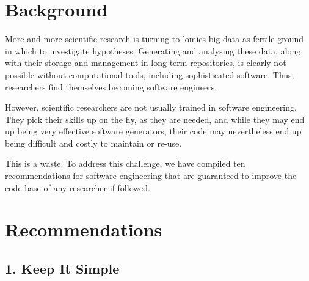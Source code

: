 \documentclass{bmcart}
\begin{document}


\section*{Background}

More and more scientific research is turning to 'omics big data as fertile ground in which to investigate hypotheses. Generating and analysing these data, along with their storage and management in long-term repositories, is clearly not possible without computational tools, including sophisticated software. Thus, researchers find themselves becoming software engineers. 

However, scientific researchers are not usually trained in software engineering. They pick their skills up on the fly, as they are needed, and while they may end up being very effective software generators, their code may nevertheless end up being difficult and costly to maintain or re-use. 

This is a waste. To address this challenge, we have compiled ten recommendations for software engineering that are guaranteed to improve the code base of any researcher if followed. 

\section*{Recommendations}

\subsection*{1. Keep It Simple}
\end{document}
